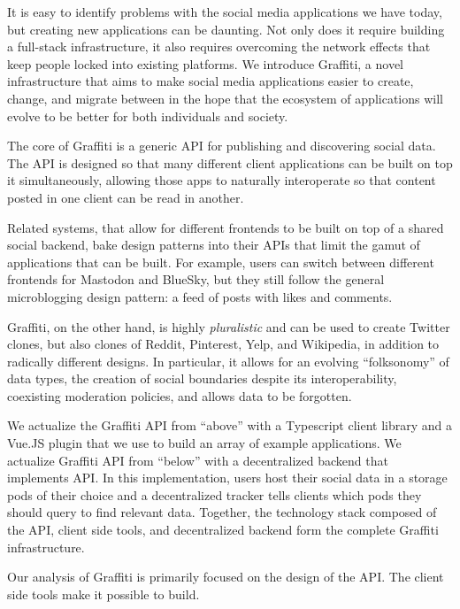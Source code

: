 
It is easy to identify problems with the social media applications we have today, but creating new applications can be daunting.
Not only does it require building a full-stack infrastructure, it also requires overcoming the network effects that keep people locked into existing platforms.
We introduce Graffiti, a novel infrastructure that aims to make social media applications easier to create, change, and migrate between in the hope that the ecosystem of applications will evolve to be better for both individuals and society.

The core of Graffiti is a generic API for publishing and discovering social data. The API is designed so that many different client applications can be built on top it simultaneously, allowing those apps to naturally interoperate so that content posted in one client can be read in another.

Related systems, that allow for different frontends to be built on top of a shared social backend, bake design patterns into their APIs that limit the gamut of applications that can be built.
For example, users can switch between different frontends for Mastodon and BlueSky, but they still follow the general microblogging design pattern: a feed of posts with likes and comments.

Graffiti, on the other hand, is highly \emph{pluralistic} and can be used to create Twitter clones, but also clones of Reddit, Pinterest, Yelp, and Wikipedia, in addition to radically different designs.
In particular,
it allows for an evolving ``folksonomy'' of data types, the creation of social boundaries despite its interoperability, coexisting moderation policies, and allows data to be forgotten.

We actualize the Graffiti API from ``above'' with a Typescript client library and a Vue.JS plugin that we use to build an array of example applications.
We actualize Graffiti API from ``below'' with a decentralized backend that implements API.
In this implementation, users host their social data in a storage pods of their choice and a decentralized tracker tells clients which pods they should query to find relevant data.
Together, the technology stack composed of the API, client side tools, and decentralized backend form the complete Graffiti infrastructure.

Our analysis of Graffiti is primarily focused on the design of the API. The client side tools make it possible to build.

